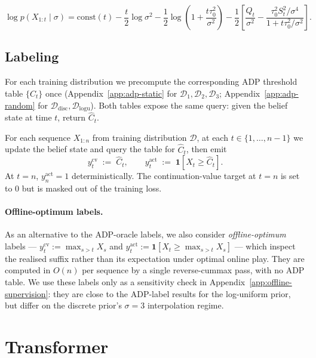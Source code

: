 \documentclass[11pt]{article}
\begin{document}
\begin{equation}
\label{eq:marginal-loglik}
\log p(X_{1:t} \mid \sigma) = \mathrm{const}(t) - \frac{t}{2}\log\sigma^2 - \frac{1}{2}\log\!\left(1 + \frac{t\tau_0^2}{\sigma^2}\right) - \frac{1}{2}\!\left[\frac{Q_t}{\sigma^2} - \frac{\tau_0^2 S_t^2/\sigma^4}{1 + t\tau_0^2/\sigma^2}\right].
\end{equation}

\subsection{Labeling}
\label{sec:labeling}

For each training distribution we precompute the corresponding ADP threshold table $\{\widehat C_t\}$ once (Appendix~\ref{app:adp-static} for $\mathcal{D}_1, \mathcal{D}_2, \mathcal{D}_3$; Appendix~\ref{app:adp-random} for $\mathcal{D}_{\mathrm{disc}}, \mathcal{D}_{\mathrm{logu}}$). Both tables expose the same query: given the belief state at time $t$, return $\widehat C_t$.

For each sequence $X_{1:n}$ from training distribution $\mathcal{D}$, at each $t \in \{1, \ldots, n-1\}$ we update the belief state and query the table for $\widehat C_t$, then emit
\[
y_t^{\mathrm{cv}} \;:=\; \widehat C_t,
\qquad
y_t^{\mathrm{act}} \;:=\; \mathbf{1}[X_t \ge \widehat C_t].
\]
At $t = n$, $y_n^{\mathrm{act}} = 1$ deterministically. The continuation-value target at $t=n$ is set to $0$ but is masked out of the training loss.

\paragraph{Offline-optimum labels.} As an alternative to the ADP-oracle labels, we also consider \emph{offline-optimum} labels --- $y_t^{\mathrm{cv}} := \max_{s > t} X_s$ and $y_t^{\mathrm{act}} := \mathbf{1}[X_t \ge \max_{s > t} X_s]$ --- which inspect the realised suffix rather than its expectation under optimal online play. They are computed in $O(n)$ per sequence by a single reverse-cummax pass, with no ADP table. We use these labels only as a sensitivity check in Appendix~\ref{app:offline-supervision}: they are close to the ADP-label results for the log-uniform prior, but differ on the discrete prior's $\sigma=3$ interpolation regime.

\section{Transformer}
\label{sec:training}
\end{document}
